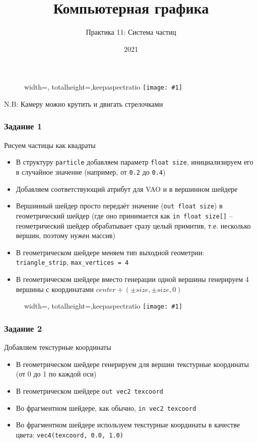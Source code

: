 \documentclass{beamer}
\title{Компьютерная графика}
\subtitle{Практика 11: Система частиц}
\date{2021}
\newcommand{\slideimage}[1]{
  \begin{figure}
    \begin{adjustbox}{width=\textwidth, totalheight=\textheight-2\baselineskip-2\baselineskip,keepaspectratio}
      \texttt{[image: \#1]}
    \end{adjustbox}
  \end{figure}
}
\begin{document}
\frame{\titlepage}

\begin{frame}[fragile]
\slideimage{0.png}
\end{frame}

\begin{frame}[fragile]
N.B: Камеру можно крутить и двигать стрелочками
\end{frame}

\begin{frame}[fragile]
\frametitle{Задание 1}
Рисуем частицы как квадраты
\begin{itemize}
\item В структуру \verb|particle| добавляем параметр \verb|float size|, инициализируем его в случайное значение (например, от \verb|0.2| до \verb|0.4|)
\item Добавляем соответствующий атрибут для VAO и в вершинном шейдере
\item Вершинный шейдер просто передаёт значение (\verb|out float size|) в геометрический шейдер (где оно принимается как \verb|in float size[]| -- геометрический шейдер обрабатывает сразу целый примитив, т.е. несколько вершин, поэтому нужен массив)
\item В геометрическом шейдере меняем тип выходной геометрии: \verb|triangle_strip|, \verb|max_vertices = 4|
\item В геометрическом шейдере вместо генерации одной вершины генерируем 4 вершины с координатами \begin{math}center + (\pm size, \pm size, 0)\end{math}
\end{itemize}
\end{frame}

\begin{frame}[fragile]
\slideimage{1.png}
\end{frame}

\begin{frame}[fragile]
\frametitle{Задание 2}
Добавляем текстурные координаты
\begin{itemize}
\item В геометрическом шейдере генерируем для вершин текстурные координаты (от 0 до 1 по каждой оси)
\item В геометрическом шейдере \verb|out vec2 texcoord|
\item Во фрагментном шейдере, как обычно, \verb|in vec2 texcoord|
\item Во фрагментном шейдере используем текстурные координаты в качестве цвета: \verb|vec4(texcoord, 0.0, 1.0)|
\end{itemize}
\end{frame}
\end{document}
